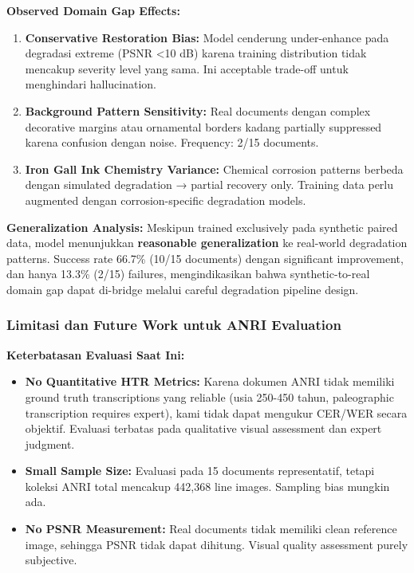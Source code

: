 \textbf{Observed Domain Gap Effects:}
\begin{enumerate}
    \item \textbf{Conservative Restoration Bias:} Model cenderung under-enhance pada degradasi extreme (PSNR <10 dB) karena training distribution tidak mencakup severity level yang sama. Ini acceptable trade-off untuk menghindari hallucination.
    
    \item \textbf{Background Pattern Sensitivity:} Real documents dengan complex decorative margins atau ornamental borders kadang partially suppressed karena confusion dengan noise. Frequency: 2/15 documents.
    
    \item \textbf{Iron Gall Ink Chemistry Variance:} Chemical corrosion patterns berbeda dengan simulated degradation → partial recovery only. Training data perlu augmented dengan corrosion-specific degradation models.
\end{enumerate}

\textbf{Generalization Analysis:}
Meskipun trained exclusively pada synthetic paired data, model menunjukkan \textbf{reasonable generalization} ke real-world degradation patterns. Success rate 66.7\% (10/15 documents) dengan significant improvement, dan hanya 13.3\% (2/15) failures, mengindikasikan bahwa synthetic-to-real domain gap dapat di-bridge melalui careful degradation pipeline design.

\subsubsection{Limitasi dan Future Work untuk ANRI Evaluation}

\textbf{Keterbatasan Evaluasi Saat Ini:}
\begin{itemize}
    \item \textbf{No Quantitative HTR Metrics:} Karena dokumen ANRI tidak memiliki ground truth transcriptions yang reliable (usia 250-450 tahun, paleographic transcription requires expert), kami tidak dapat mengukur CER/WER secara objektif. Evaluasi terbatas pada qualitative visual assessment dan expert judgment.
    
    \item \textbf{Small Sample Size:} Evaluasi pada 15 documents representatif, tetapi koleksi ANRI total mencakup 442,368 line images. Sampling bias mungkin ada.
    
    \item \textbf{No PSNR Measurement:} Real documents tidak memiliki clean reference image, sehingga PSNR tidak dapat dihitung. Visual quality assessment purely subjective.
\end{itemize}

